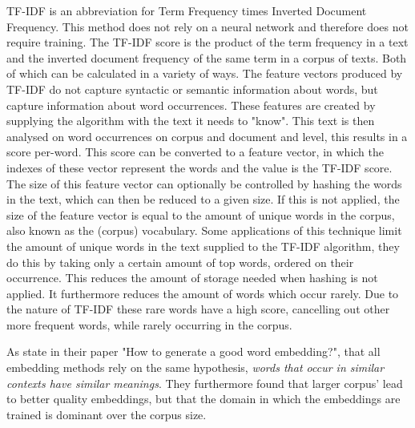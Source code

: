 \documentclass[../../Thesis.tex]{subfiles}
\begin{document}
\begin{jumpin}
TF-IDF is an abbreviation for Term Frequency times Inverted Document Frequency. This method does not rely on a neural network and therefore does not require training. The TF-IDF score is the product of the term frequency in a text and the inverted document frequency of the same term in a corpus of texts. Both of which can be calculated in a variety of ways. The feature vectors produced by TF-IDF do not capture syntactic or semantic information about words, but capture information about word occurrences. These features are created by supplying the algorithm with the text it needs to "know". This text is then analysed on word occurrences on corpus and document and level, this results in a score per-word. This score can be converted to a feature vector, in which the indexes of these vector represent the words and the value is the TF-IDF score. The size of this feature vector can optionally be controlled by hashing the words in the text, which can then be reduced to a given size. If this is not applied, the size of the feature vector is equal to the amount of unique words in the corpus, also known as the (corpus) vocabulary. Some applications of this technique limit the amount of unique words in the text supplied to the TF-IDF algorithm, they do this by taking only a certain amount of top words, ordered on their occurrence. This reduces the amount of storage needed when hashing is not applied. It furthermore reduces the amount of words which occur rarely. Due to the nature of TF-IDF these rare words have a high score, cancelling out other more frequent words, while rarely occurring in the corpus.

\end{jumpin}
As \citet{lai2016generate} state in their paper "How to generate a good word embedding?", that all embedding methods rely on the same hypothesis, \textit{words that occur in similar contexts have similar meanings}. They furthermore found that larger corpus' lead to better quality embeddings, but that the domain in which the embeddings are trained is dominant over the corpus size. 
\end{document}
